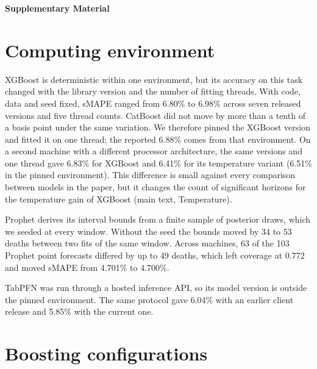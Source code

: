 \clearpage
\appendix
\setcounter{table}{0}
\setcounter{figure}{0}
\setcounter{section}{0}
\renewcommand{\thetable}{S\arabic{table}}
\renewcommand{\thefigure}{S\arabic{figure}}
\renewcommand{\thesection}{S\arabic{section}}

\begin{center}
\large\bfseries Supplementary Material
\end{center}

\section{Computing environment}\label{sec:s-repro}

XGBoost is deterministic within one environment, but its accuracy on this task changed with
the library version and the number of fitting threads. With code, data and seed fixed, sMAPE
ranged from 6.80\% to 6.98\% across seven released versions and five thread counts. CatBoost
did not move by more than a tenth of a basis point under the same variation. We therefore
pinned the XGBoost version and fitted it on one thread; the reported 6.88\% comes from that
environment. On a second machine with a different processor architecture, the same versions
and one thread gave 6.83\% for XGBoost and 6.41\% for its temperature variant (6.51\% in
the pinned environment). This
difference is small against every comparison between models in the paper, but it changes
the count of significant horizons for the temperature gain of XGBoost (main text, Temperature).

Prophet derives its interval bounds from a finite sample of posterior draws, which we seeded
at every window. Without the seed the bounds moved by 34 to 53 deaths between two fits of
the same window. Across machines, 63 of the 103 Prophet point forecasts differed by up to 49
deaths, which left coverage at 0.772 and moved sMAPE from 4.701\% to 4.700\%.

TabPFN was run through a hosted inference API, so its model version is outside the pinned
environment. The same protocol gave 6.04\% with an earlier client release and 5.85\% with
the current one.

\section{Boosting configurations}

